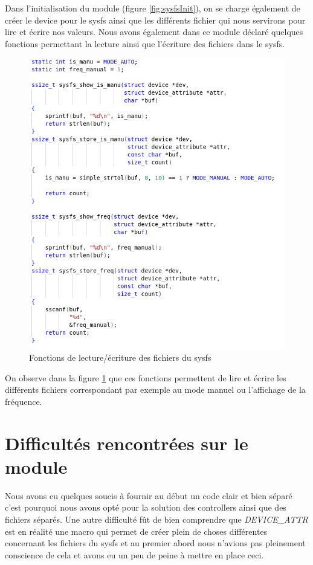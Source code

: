\documentclass{ReportTemplate}
\begin{document}
Dans l'initialisation du module (figure \ref{fig:sysfsInit}), on se charge également de créer le device pour
le sysfs ainsi que les différents fichier qui nous servirons pour lire et écrire
nos valeurs.\newpage
Nous avons également dans ce module déclaré quelques fonctions permettant la
lecture ainsi que l'écriture des fichiers dans le sysfs.
\begin{figure}[H]
    \includegraphics[width= \textwidth]{imageSources/Utility_Fct_Module.png}
    \caption{Fonctions de lecture/écriture des fichiers du sysfs}
    \label{fig:sysfsFunctions}
\end{figure}
On observe dans la figure \ref{fig:sysfsFunctions} que ces fonctions permettent
de lire et écrire les différents fichiers correspondant par exemple au mode
manuel ou l'affichage de la fréquence.\newpage
\section{Difficultés rencontrées sur le module}
Nous avons eu quelques soucis à fournir au début un code clair et bien séparé
c'est pourquoi nous avons opté pour la solution des controllers ainsi que des
fichiers séparés.\newline
Une autre difficulté fût de bien comprendre que \textit{DEVICE\_ATTR} est en
réalité une macro qui permet de créer plein de choses différentes concernant les
fichiers du sysfs et au premier abord nous n'avions pas pleinement conscience de
cela et avons eu un peu de peine à mettre en place ceci.
\end{document}
